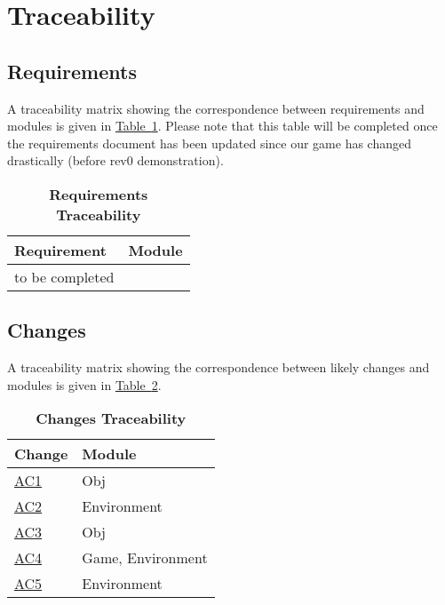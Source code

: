 \documentclass[12pt, titlepage]{article}
\begin{document}
\section{Traceability}
\subsection{Requirements}
A traceability matrix showing the correspondence between requirements and modules is given in \hyperref[tab:reqtrace]{Table~\ref*{tab:reqtrace}}.  Please note that this table will be completed once the requirements document has been updated since our game has changed drastically (before rev0 demonstration).

\begin{table}[h]
\caption{\bf Requirements Traceability} \label{tab:reqtrace}
\begin{tabularx}{\textwidth}{p{4cm}X}
\toprule {\bf Requirement} & {\bf Module}\\
\midrule
to be completed&\\
\bottomrule
\end{tabularx}
\end{table}

\subsection{Changes}
A traceability matrix showing the correspondence between likely changes and modules is given in \hyperref[tab:changetrace]{Table~\ref*{tab:changetrace}}.

\begin{table}[h]
\caption{\bf Changes Traceability} \label{tab:changetrace}
\begin{tabularx}{\textwidth}{p{4cm}X}
\toprule {\bf Change} & {\bf Module}\\
\midrule
\hyperref[sec:changes]{AC1} & Obj\\
\hyperref[sec:changes]{AC2} & Environment\\
\hyperref[sec:changes]{AC3} & Obj\\
\hyperref[sec:changes]{AC4} & Game, Environment\\
\hyperref[sec:changes]{AC5} & Environment\\
\bottomrule
\end{tabularx}
\end{table}
\end{document}
